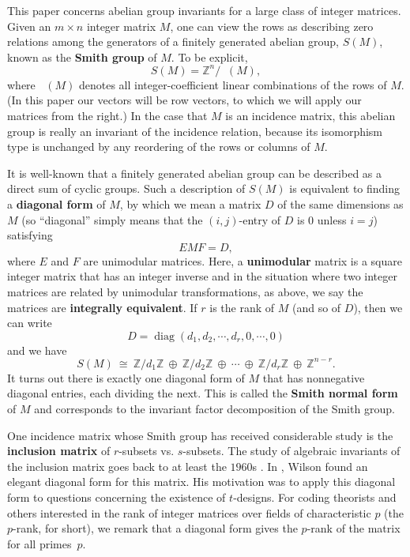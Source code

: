\documentclass[11pt]{article}
\theoremstyle{definition}
\numberwithin{equation}{section}
\numberwithin{equation}{section}
\newcommand{\Z}[0]{\mathbb{Z}}
\DeclareMathOperator{\rowz}{row_{\mathbb{Z}}}
\DeclareMathOperator{\diag}{diag}
\begin{document}
This paper concerns abelian group invariants for a large class of integer matrices.  Given an $m \times n$ integer matrix $M$, one can view the rows as describing zero relations among the generators of a finitely generated abelian group, $S(M)$, known as the {\bf Smith group} of $M$.  To be explicit,
\[
S(M) = \Z^{n} / \rowz(M),
\]
where $\rowz(M)$ denotes all integer-coefficient linear combinations of the rows of $M$.  (In this paper our vectors will be row vectors, to which we will apply our matrices from the right.)  In the case that $M$ is an incidence matrix, this abelian group is really an invariant of the incidence relation, because its isomorphism type is unchanged by any reordering of the rows or columns of $M$.  

It is well-known that a  finitely generated abelian group can be described as a direct sum of cyclic groups.  Such a description of $S(M)$ is equivalent to finding a {\bf diagonal form} of $M$, by which we mean a matrix $D$ of the same dimensions as $M$ (so ``diagonal'' simply means that the $(i,j)$-entry of $D$ is $0$ unless $i=j$) satisfying 
\[ E M F = D, \]
where $E$ and $F$ are unimodular matrices.  Here, a {\bf unimodular} matrix is a square integer matrix that has an integer inverse and in the situation where two integer matrices are related by unimodular transformations, as above, we say the matrices are {\bf integrally equivalent}.  If $r$ is the rank of $M$ (and so of $D$), then we can write
\[
D = \diag(d_{1}, d_{2}, \cdots, d_{r}, 0, \cdots, 0)
\]
and we have 
\[
S(M) \ \cong\  \Z/d_{1}\Z \ \oplus\ \Z/d_{2}\Z \ \oplus\ \cdots \ \oplus\ \Z/d_{r}\Z \ \oplus\ \Z^{n - r}.
\]
It turns out there is exactly one diagonal form of $M$ that has nonnegative diagonal entries, each dividing the next.  This is called the \textbf{Smith normal form} of $M$ and corresponds to the invariant factor decomposition of the Smith group.

One incidence matrix whose Smith group has received considerable study is the {\bf inclusion matrix} of $r$-subsets vs. $s$-subsets.  The study of algebraic invariants of the inclusion matrix goes back to at least the $1960$s \cite{gottlieb}.   In \cite{wilson_classic}, Wilson found an elegant diagonal form for this matrix.  His motivation was to apply this diagonal form to questions concerning the existence of $t$-designs. For coding theorists and others interested in the rank of integer matrices over fields of characteristic $p$ (the $p$-rank, for short), we remark that a diagonal form gives the $p$-rank of the matrix for all primes~$p$.
\end{document}

